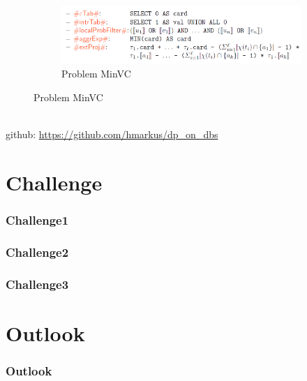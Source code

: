 \documentclass[c,8pt,xcolor...,x11names]{beamer}
\begin{document}
\begin{frame}
\begin{minipage}{0.54\textwidth}
\begin{figure}
\begin{subfigure}[b]{\textwidth}
			\end{subfigure}\hfill\\
			\begin{subfigure}[b]{\textwidth}
				\includegraphics[width=0.8\linewidth]{images/dpdbMinVC.png}
				\caption{Problem MinVC}

			\end{subfigure}
		\end{figure}

	\end{minipage}
	\medskip \\
	github: \url{https://github.com/hmarkus/dp_on_dbs}
\end{frame}


\section{Challenge}
\begin{frame}
	\frametitle{Challenge1}
	\medskip
	
\end{frame}

\begin{frame}
	\frametitle{Challenge2}
	\medskip
	
\end{frame}

\begin{frame}
	\frametitle{Challenge3}
	\medskip
	
\end{frame}

\section{Outlook}
\begin{frame}
	\frametitle{Outlook}
	\medskip

\end{frame}
\end{document}
